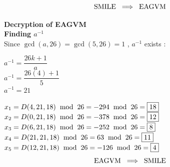 \[\text{SMILE} \hspace{0.2cm} \Longrightarrow \hspace{0.2cm} \text{EAGVM}\]


\vspace{1cm}
\textbf{Decryption of EAGVM}\\[0.15cm]
\textbf{Finding \(a^{-1}\)}\\[0.1cm]
Since \(\gcd(a,26) = \gcd(5,26) = 1\) , \(a^{-1}\) exists :
\begin{center}
    \(a^{-1} = \dfrac{26k+1}{a}\)\\[0.25cm]
    \(a^{-1} = \dfrac{26(4)+1}{5}\)\\[0.25cm]
    \(\boxed{a^{-1} = 21}\)
\end{center}
\vspace{0.75cm}
\(x_1 = D(4,21,18) \hspace{0.2cm} \text{mod} \hspace{0.2cm} 26 = -294 \hspace{0.2cm} \text{mod} \hspace{0.2cm} 26 = \boxed{18}\)\\[0.15cm]
\(x_2 = D(0,21,18) \hspace{0.2cm} \text{mod} \hspace{0.2cm} 26 = -378 \hspace{0.2cm} \text{mod} \hspace{0.2cm} 26 = \boxed{12}\)\\[0.15cm]
\(x_3 = D(6,21,18) \hspace{0.2cm} \text{mod} \hspace{0.2cm} 26 = -252 \hspace{0.2cm} \text{mod} \hspace{0.2cm} 26 = \boxed{8}\)\\[0.15cm]
\(x_4 = D(21,21,18) \hspace{0.2cm} \text{mod} \hspace{0.2cm} 26 = 63 \hspace{0.2cm} \text{mod} \hspace{0.2cm} 26 = \boxed{11}\)\\[0.15cm]
\(x_5 = D(12,21,18) \hspace{0.2cm} \text{mod} \hspace{0.2cm} 26 = -126 \hspace{0.2cm} \text{mod} \hspace{0.2cm} 26 = \boxed{4}\)\\[0.15cm]


\[\text{EAGVM} \hspace{0.2cm} \Longrightarrow \hspace{0.2cm} \text{SMILE}\]

